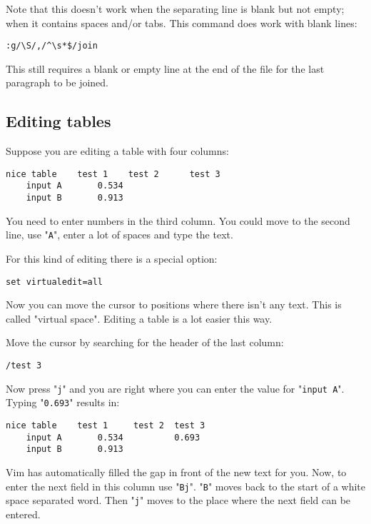 Note that this doesn't work when the separating line is blank but not empty; when it contains spaces and/or tabs.
This command does work with blank lines:

\begin{Verbatim}[samepage=true]
 :g/\S/,/^\s*$/join
\end{Verbatim}

This still requires a blank or empty line at the end of the file for the last paragraph to be joined.
\subsection{Editing tables}
Suppose you are editing a table with four columns:

\begin{Verbatim}[samepage=true]
    nice table    test 1    test 2      test 3 
    input A       0.534 
    input B       0.913 
\end{Verbatim}

You need to enter numbers in the third column.
You could move to the second line, use "\verb!A!", enter a lot of spaces and type the text.

For this kind of editing there is a special option:

\begin{Verbatim}[samepage=true]
 set virtualedit=all
\end{Verbatim}

Now you can move the cursor to positions where there isn't any text.
This is called "virtual space".
Editing a table is a lot easier this way.

Move the cursor by searching for the header of the last column:

\begin{Verbatim}[samepage=true]
 /test 3
\end{Verbatim}

Now press "\verb!j!" and you are right where you can enter the value for "\verb!input A!".
Typing "\verb!0.693!" results in:

\begin{Verbatim}[samepage=true]
    nice table    test 1     test 2  test 3 
    input A       0.534          0.693 
    input B       0.913 
\end{Verbatim}

Vim has automatically filled the gap in front of the new text for you.
Now, to enter the next field in this column use "\verb!Bj!".
"\verb!B!" moves back to the start of a white space separated word.
Then "\verb!j!" moves to the place where the next field can be entered.

